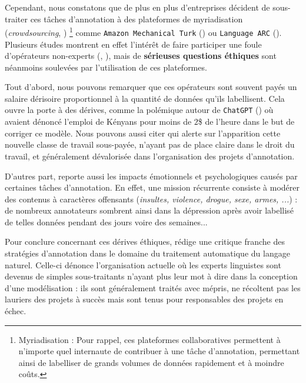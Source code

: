 			Cependant, nous constatons que de plus en plus d'entreprises décident de sous-traiter ces tâches d'annotation à des plateformes de myriadisation (\textit{crowdsourcing}, \cite{howe:2008:crowdsourcing-how-power}) \footnote{
				Myriadisation : Pour rappel, ces plateformes collaboratives permettent à n'importe quel internaute de contribuer à une tâche d'annotation, permettant ainsi de labelliser de grands volumes de données rapidement et à moindre coûts.
			} comme \texttt{Amazon Mechanical Turk} (\cite{callison-burch-dredze:2010:creating-speech-language}) ou \texttt{Language ARC} (\cite{fiumara-etal:2020:languagearc-developing-language}).
			Plusieurs études montrent en effet l'intérêt de faire participer une foule d'opérateurs non-experts (\cite{snow-etal:2008:cheap-fast-it}, \cite{fort:2017:experts-ou-foule}), mais de \textbf{sérieuses questions éthiques} sont néanmoins soulevées par l'utilisation de ces plateformes.
			
			Tout d'abord, nous pouvons remarquer que ces opérateurs sont souvent payés un salaire dérisoire proportionnel à la quantité de données qu'ils labellisent.
			Cela ouvre la porte à des dérives, comme la polémique autour de \texttt{ChatGPT} (\cite{openai:2023:chatgpt}) où \cite{perrigo-zorthian:2023:exclusive-openai-used} avaient dénoncé l'emploi de Kényans pour moins de $2$\$ de l'heure dans le but de corriger ce modèle.
			Nous pouvons aussi citer \cite{dzieza:2023:ai-lot-work} qui alerte sur l'apparition cette nouvelle classe de travail sous-payée, n'ayant pas de place claire dans le droit du travail, et généralement dévalorisée dans l'organisation des projets d'annotation.
			
			D'autres part, \cite{rowe:2023:it-destroyed-me} reporte aussi les impacts émotionnels et psychologiques causés par certaines tâches d'annotation.
			En effet, une mission récurrente consiste à modérer des contenus à caractères offensants (\textit{insultes, violence, drogue, sexe, armes, ...}) : de nombreux annotateurs sombrent ainsi dans la dépression après avoir labellisé de telles données pendant des jours voire des semaines...
			
			\begin{leftBarInformation}
				Pour conclure concernant ces dérives éthiques, \cite{valette:2016:analyse-statistique-donnees} rédige une critique franche des stratégies d'annotation dans le domaine du traitement automatique du langage naturel.
				Celle-ci dénonce l'organisation actuelle où les experts linguistes sont devenus de simples sous-traitants n'ayant plus leur mot à dire dans la conception d'une modélisation : ils sont généralement traités avec mépris, ne récoltent pas les lauriers des projets à succès mais sont tenus pour responsables des projets en échec.
			\end{leftBarInformation}
	
